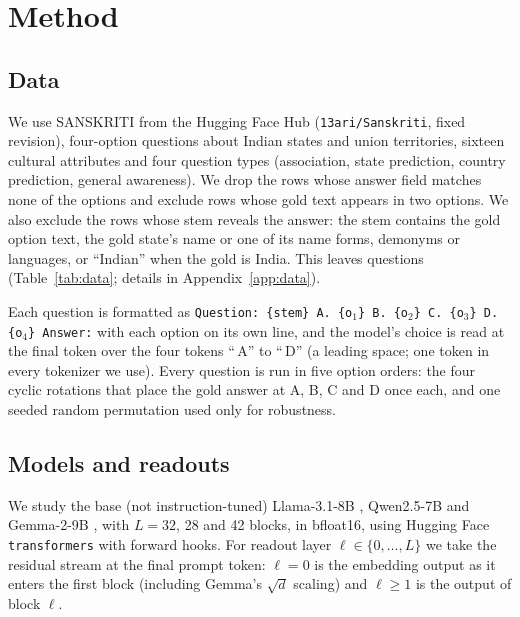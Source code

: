 \section{Method}
\label{sec:method}

\subsection{Data}
\label{sec:data}

We use SANSKRITI \citep{maji-etal-2025-sanskriti} from the Hugging Face Hub (\texttt{13ari/Sanskriti}, fixed revision), \nRaw{} four-option questions about \nStates{} Indian states and union territories, sixteen cultural attributes and four question types (association, state prediction, country prediction, general awareness).
We drop the \nDropped{} rows whose answer field matches none of the options and exclude \nAmbiguous{} rows whose gold text appears in two options.
We also exclude the \nLeaks{} rows whose stem reveals the answer: the stem contains the gold option text, the gold state's name or one of its name forms, demonyms or languages, or ``Indian'' when the gold is India.
This leaves \nAnalysis{} questions (Table~\ref{tab:data}; details in Appendix~\ref{app:data}).

Each question is formatted as
\texttt{Question: \{stem\} A. \{o$_1$\} B. \{o$_2$\} C. \{o$_3$\} D. \{o$_4$\} Answer:}
with each option on its own line, and the model's choice is read at the final token over the four tokens ``\,A'' to ``\,D'' (a leading space; one token in every tokenizer we use).
Every question is run in five option orders: the four cyclic rotations that place the gold answer at A, B, C and D once each, and one seeded random permutation used only for robustness.

\subsection{Models and readouts}

We study the base (not instruction-tuned) Llama-3.1-8B \citep{grattafiori2024llama3}, Qwen2.5-7B \citep{qwen2025qwen25} and Gemma-2-9B \citep{gemma2024gemma2}, with $L = 32$, 28 and 42 blocks, in bfloat16, using Hugging Face \texttt{transformers} with forward hooks.
For readout layer $\ell \in \{0, \dots, L\}$ we take the residual stream at the final prompt token: $\ell = 0$ is the embedding output as it enters the first block (including Gemma's $\sqrt{d}$ scaling) and $\ell \geq 1$ is the output of block $\ell$.

